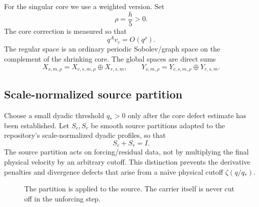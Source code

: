 \documentclass[11pt]{article}
\numberwithin{equation}{section}
\begin{document}
For the singular core we use a weighted version.  Set
\begin{equation}
\rho=\frac h5>0.
\label{eq:rho}
\end{equation}
The core correction is measured so that
\begin{equation}
q^A v_c=O(q^\rho).
\label{eq:coreweight}
\end{equation}
The regular space is an ordinary periodic Sobolev/graph space on the complement of the shrinking core.  The global spaces are direct sums
\begin{equation}
X_{s,m,\rho}=X_{c,s,m,\rho}\oplus X_{r,s,m},
\qquad
Y_{s,m,\rho}=Y_{c,s,m,\rho}\oplus Y_{r,s,m}.
\label{eq:globalspaces}
\end{equation}

\subsection{Scale-normalized source partition}
Choose a small dyadic threshold \(q_*>0\) only after the core defect estimate has been established.  Let \(S_c,S_r\) be smooth source partitions adapted to the repository's scale-normalized dyadic profiles, so that
\begin{equation}
S_c+S_r=I.
\label{eq:partition}
\end{equation}
The source partition acts on forcing/residual data, not by multiplying the final physical velocity by an arbitrary cutoff.  This distinction prevents the derivative penalties and divergence defects that arise from a naive physical cutoff \(\zeta(q/q_*)\).

\begin{figure}[ht]
\centering
{}

\caption{The partition is applied to the source.  The carrier itself is never cut off in the unforcing step.}
\label{fig:sourcesplit}
\end{figure}
\end{document}
